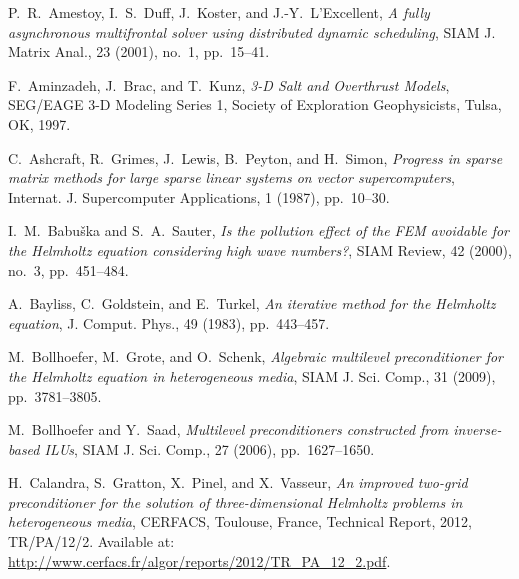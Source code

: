 \begin{thebibliography}{10} 

{\sc P.~R.~Amestoy, I.~S.~Duff, J.~Koster, and J.-Y.~L'Excellent},
{\em A fully asynchronous multifrontal solver using distributed dynamic 
 scheduling},
SIAM J. Matrix Anal., 23 (2001), no.~1, pp.~15--41.

{\sc F.~Aminzadeh, J.~Brac, and T.~Kunz},
{\em 3-D Salt and Overthrust Models},
SEG/EAGE 3-D Modeling Series 1, Society of Exploration Geophysicists, 
Tulsa, OK, 1997.

{\sc C.~Ashcraft, R.~Grimes, J.~Lewis, B.~Peyton, and H.~Simon},
{\em Progress in sparse matrix methods for large sparse linear systems on 
 vector supercomputers},
Internat. J. Supercomputer Applications, 1 (1987), pp.~10--30.

{\sc I.~M.~Babu\v{s}ka and S.~A.~Sauter},
{\em Is the pollution effect of the FEM avoidable for the Helmholtz equation 
     considering high wave numbers?},
SIAM Review, 42 (2000), no.~3, pp.~451--484.


{\sc A.~Bayliss, C.~Goldstein, and E.~Turkel},
{\em An iterative method for the Helmholtz equation},
J. Comput. Phys., 49 (1983), pp.~443--457.

{\sc M.~Bollhoefer, M.~Grote, and O.~Schenk}, 
{\em Algebraic multilevel preconditioner for the Helmholtz equation in 
 heterogeneous media},
SIAM J. Sci. Comp., 31 (2009), pp.~3781--3805.

{\sc M.~Bollhoefer and Y.~Saad},
{\em Multilevel preconditioners constructed from inverse-based ILUs},
SIAM J. Sci. Comp., 27 (2006), pp.~1627--1650.

{\sc H.~Calandra, S.~Gratton, X.~Pinel, and X.~Vasseur},
{\em An improved two-grid preconditioner for the solution of three-dimensional 
     Helmholtz problems in heterogeneous media},
CERFACS, Toulouse, France, Technical Report, 2012, TR/PA/12/2.
Available at: \url{http://www.cerfacs.fr/algor/reports/2012/TR_PA_12_2.pdf}.


\end{thebibliography}
